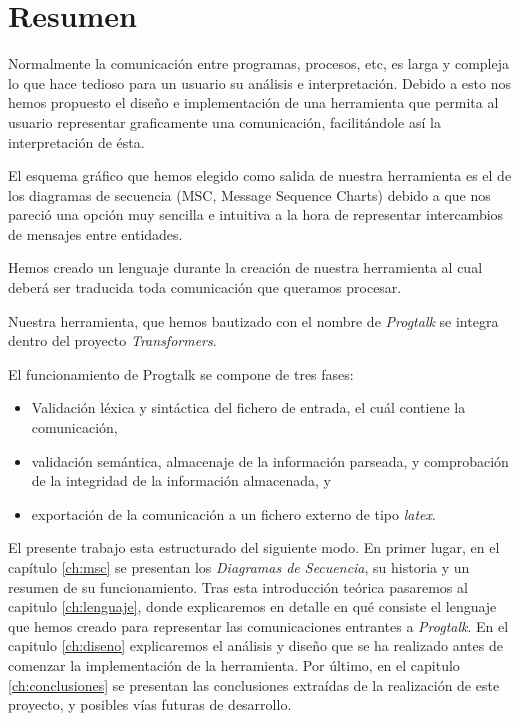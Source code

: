 \chapter*{Resumen}

Normalmente la comunicación entre programas, procesos, etc, es larga y
compleja lo que hace tedioso para un usuario su análisis e
interpretación. Debido a esto nos hemos propuesto el diseño e
implementación de una herramienta que permita al usuario representar
graficamente una comunicación, facilitándole así la interpretación de
ésta. 

El esquema gráfico que hemos elegido como salida de nuestra
herramienta es el de los diagramas de secuencia (MSC, Message Sequence
Charts) debido a que nos pareció una opción muy sencilla e intuitiva
a la hora de representar intercambios de mensajes entre entidades.

Hemos creado un lenguaje durante la creación de nuestra herramienta
al cual deberá ser traducida toda comunicación que queramos procesar.

Nuestra herramienta, que hemos bautizado con el nombre de
\textit{Progtalk} se integra dentro del proyecto \textit{Transformers}. 

El funcionamiento de Progtalk se compone de tres fases:

\begin{itemize}
\item Validación léxica y sintáctica del fichero de entrada, el cuál
  contiene la comunicación,
\item validación semántica, almacenaje de la información parseada, y
  comprobación de la integridad de la información almacenada, y
\item exportación de la comunicación a un fichero externo de tipo
  \textit{latex}.
\end{itemize}

El presente trabajo esta estructurado del siguiente modo. En primer
lugar, en el capítulo \ref{ch:msc} se presentan los \textit{Diagramas
  de Secuencia}, su historia y un resumen de su funcionamiento. Tras
esta introducción teórica pasaremos al capitulo \ref{ch:lenguaje},
donde explicaremos en detalle en qué consiste el lenguaje que hemos
creado para representar las comunicaciones entrantes a
\textit{Progtalk}. En el capitulo \ref{ch:diseno} explicaremos el
análisis y diseño que se ha realizado antes de comenzar la
implementación de la herramienta. Por último, en el capitulo
\ref{ch:conclusiones} se presentan las conclusiones extraídas de la
realización de este proyecto, y posibles vías futuras de desarrollo.

